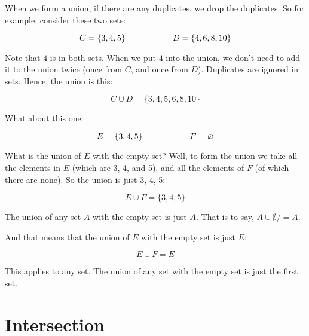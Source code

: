 \documentclass[../../../main.tex]{subfiles}
\begin{document}
When we form a union, if there are any duplicates, we drop the duplicates. So for example, consider these two sets:

\begin{equation*}
  C = \{ 3, 4, 5 \} \hskip 2cm D = \{ 4, 6, 8, 10 \}
\end{equation*}

Note that $4$ is in both sets. When we put $4$ into the union, we don't need to add it to the union twice (once from $C$, and once from $D$). Duplicates are ignored in sets. Hence, the union is this:

\begin{equation*}
  C \cup D = \{ 3, 4, 5, 6, 8, 10 \}
\end{equation*}

What about this one:

\begin{equation*}
  E = \{ 3, 4, 5 \} \hskip 2cm F = \emptyset/
\end{equation*}

What is the union of $E$ with the empty set? Well, to form the union we take all the elements in $E$ (which are 3, 4, and 5), and all the elements of $F$ (of which there are none). So the union is just 3, 4, 5:

\begin{equation*}
  E \cup F = \{ 3, 4, 5 \}
\end{equation*}

\begin{aside}
  \begin{remark}
    The union of any set $A$ with the empty set is just $A$. That is to say, $A \cup \emptyset/ = A$.
  \end{remark}
\end{aside}

And that means that the union of $E$ with the empty set is just $E$:

\begin{equation*}
  E \cup F = E
\end{equation*}

This applies to any set. The union of any set with the empty set is just the first set.


\section{Intersection}
\label{sec:set-intersection}
\end{document}

